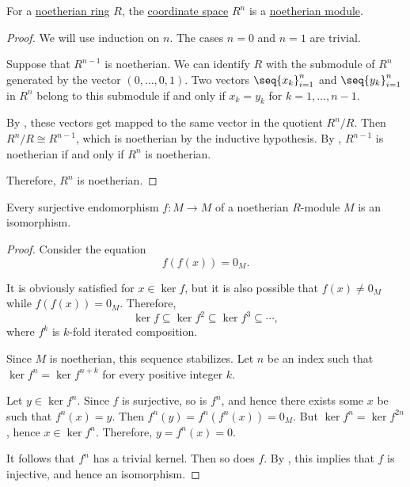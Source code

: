 \begin{proposition}\label{thm:noetherian_free_module}
  For a \hyperref[def:noetherian_semiring]{noetherian ring} \( R \), the \hyperref[def:coordinate_space]{coordinate space} \( R^n \) is a \hyperref[def:noetherian_semimodule]{noetherian module}.
\end{proposition}
\begin{proof}
  We will use induction on \( n \). The cases \( n = 0 \) and \( n = 1 \) are trivial.

  Suppose that \( R^{n-1} \) is noetherian. We can identify \( R \) with the submodule of \( R^n \) generated by the vector \( (0, \ldots, 0, 1) \). Two vectors \( \seq{ x_k }_{i=1}^n \) and  \( \seq{ y_k }_{i=1}^n \) in \( R^n \) belong to this submodule if and only if \( x_k = y_k \) for \( k = 1, \ldots, n - 1 \).

  By , these vectors get mapped to the same vector in the quotient \( R^n / R \). Then \( R^n / R \cong R^{n-1} \), which is noetherian by the inductive hypothesis. By , \( R^{n-1} \) is noetherian if and only if \( R^n \) is noetherian.

  Therefore, \( R^n \) is noetherian.
\end{proof}

\begin{lemma}\label{thm:surjective_endomorphism_over_noetherian_module}
  Every surjective endomorphism \( f: M \to M \) of a noetherian \( R \)-module \( M \) is an isomorphism.
\end{lemma}
\begin{proof}
  Consider the equation
  \begin{equation*}
    f(f(x)) = 0_M.
  \end{equation*}

  It is obviously satisfied for \( x \in \ker f \), but it is also possible that \( f(x) \neq 0_M \) while \( f(f(x)) = 0_M \). Therefore,
  \begin{equation*}
    \ker f \subseteq \ker f^2 \subseteq \ker f^3 \subseteq \cdots,
  \end{equation*}
  where \( f^k \) is \( k \)-fold iterated composition.

  Since \( M \) is noetherian, this sequence stabilizes. Let \( n \) be an index such that \( \ker f^n = \ker f^{n + k} \) for every positive integer \( k \).

  Let \( y \in \ker f^n \). Since \( f \) is surjective, so is \( f^n \), and hence there exists some \( x \) be such that \( f^n(x) = y \). Then \( f^n(y) = f^n(f^n(x)) = 0_M \). But \( \ker f^n = \ker f^{2n} \), hence \( x \in \ker f^n \). Therefore, \( y = f^n(x) = 0 \).

  It follows that \( f^n \) has a trivial kernel. Then so does \( f \). By , this implies that \( f \) is injective, and hence an isomorphism.
\end{proof}

